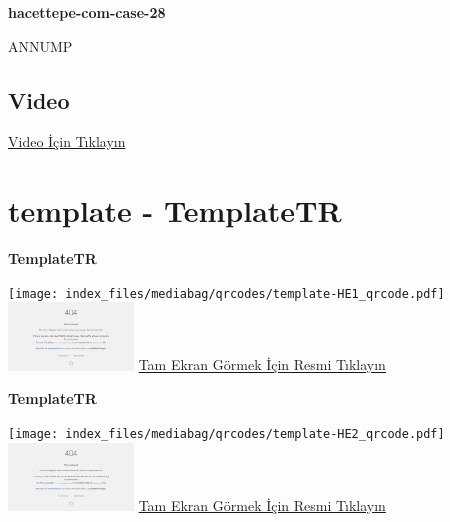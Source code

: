 \documentclass[
  letterpaper,
  DIV=11,
  numbers=noendperiod]{scrreprt}
\begin{document}
\textbf{hacettepe-com-case-28}

\begin{tcolorbox}[enhanced jigsaw, breakable, opacitybacktitle=0.6, arc=.35mm, colbacktitle=quarto-callout-tip-color!10!white, colback=white, toptitle=1mm, left=2mm, opacityback=0, colframe=quarto-callout-tip-color-frame, titlerule=0mm, rightrule=.15mm, bottomrule=.15mm, toprule=.15mm, bottomtitle=1mm, title=\textcolor{quarto-callout-tip-color}{\faLightbulb}\hspace{0.5em}{Tanı}, coltitle=black, leftrule=.75mm]

ANNUMP

\end{tcolorbox}

\hypertarget{video-27}{%
\subsection{Video}\label{video-27}}

\href{https://www.youtube.com/watch?v=yUrabUzw3RI}{Video İçin Tıklayın}

\hypertarget{sec-template}{%
\section{template - TemplateTR}\label{sec-template}}

\textbf{TemplateTR}

\texttt{[image: index\_files/mediabag/qrcodes/template-HE1\_qrcode.pdf]}
\href{https://images.patolojiatlasi.com/template/HE1.html}{\includegraphics[width=0.25\textwidth,height=\textheight]{./screenshots/thumbnail_template-HE1.png}}
\href{https://images.patolojiatlasi.com/template/HE1.html}{Tam Ekran
Görmek İçin Resmi Tıklayın}

\textbf{TemplateTR}

\texttt{[image: index\_files/mediabag/qrcodes/template-HE2\_qrcode.pdf]}
\href{https://images.patolojiatlasi.com/template/HE2.html}{\includegraphics[width=0.25\textwidth,height=\textheight]{./screenshots/thumbnail_template-HE2.png}}
\href{https://images.patolojiatlasi.com/template/HE2.html}{Tam Ekran
Görmek İçin Resmi Tıklayın}
\end{document}
